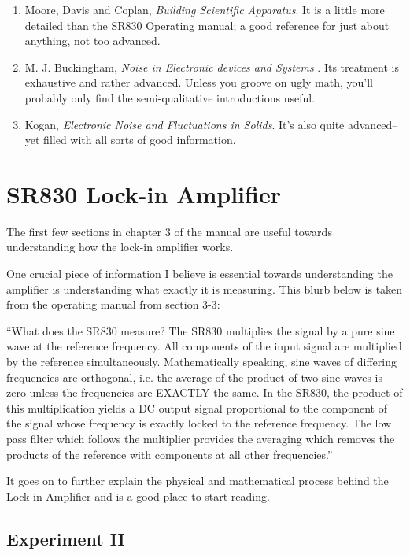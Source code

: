 \documentclass{../lab}
\begin{document}
\begin{enumerate}
    \item Moore, Davis and Coplan, \emph{Building Scientific Apparatus}. It is a little more detailed than the SR830 Operating manual; a good reference for just about anything, not too advanced.

    \item M. J. Buckingham, \emph{Noise in Electronic devices and Systems} . Its treatment is exhaustive and rather advanced. Unless you groove on ugly math, you'll probably only find the semi-qualitative introductions useful.

    \item Kogan, \emph{Electronic Noise and Fluctuations in Solids}. It's also quite advanced--yet filled with all sorts of good information.

\end{enumerate}

\section{SR830 Lock-in Amplifier}

The first few sections in chapter 3 of the manual are useful towards understanding how the lock-in amplifier works.

One crucial piece of information I believe is essential towards understanding the amplifier is understanding what exactly it is measuring. This blurb below is taken from the operating manual from section 3-3:

``What does the SR830 measure? The SR830 multiplies the signal by a pure sine wave at the reference frequency. All components of the input signal are multiplied by the reference simultaneously. Mathematically speaking, sine waves of differing frequencies are orthogonal, i.e. the average of the product of two sine waves is zero unless the frequencies are EXACTLY the same. In the SR830, the product of this multiplication yields a DC output signal proportional to the component of the signal whose frequency is exactly locked to the reference frequency. The low pass filter which follows the multiplier provides the averaging which removes the products of the reference with components at all other frequencies.''

It goes on to further explain the physical and mathematical process behind the Lock-in Amplifier and is a good place to start reading.

\subsection{Experiment II}
\end{document}
